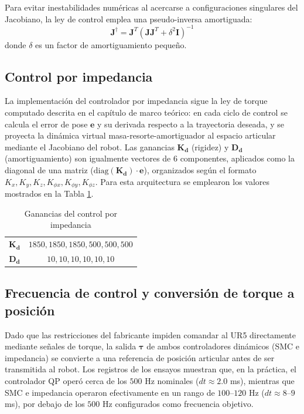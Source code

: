 Para evitar inestabilidades numéricas al acercarse a configuraciones
singulares del Jacobiano, la ley de control emplea una pseudo-inversa
amortiguada:
\begin{equation}
	\boldsymbol{J}^{\dagger} = \boldsymbol{J}^T \left(
	\boldsymbol{J}\boldsymbol{J}^T + \delta^2 \boldsymbol{I} \right)^{-1}
\end{equation}
donde \(\delta\) es un factor de amortiguamiento pequeño.

\subsection{Control por impedancia}

La implementación del controlador por impedancia sigue la ley de torque
computado descrita en el capítulo de marco teórico: en cada ciclo de control
se calcula el error de pose \(\boldsymbol{e}\) y su derivada respecto a la
trayectoria deseada, y se proyecta la dinámica virtual
masa-resorte-amortiguador
al espacio articular mediante el Jacobiano del robot. Las ganancias
\(\boldsymbol{K_d}\)
(rigidez) y \(\boldsymbol{D_d}\) (amortiguamiento) son igualmente vectores de 6
componentes, aplicados como la diagonal de una matriz
(\(\text{diag}(\boldsymbol{K_d})\cdot\boldsymbol{e}\)), organizados según el
formato \(K_x, K_y, K_z, K_{\phi x}, K_{\phi y}, K_{\phi z}\). Para esta
arquitectura se emplearon los valores mostrados en la Tabla
\ref{tab:ganancias_impedancia}.

\begin{table}[H]
	\centering
	\begin{tabular}{c|c}
		\(\boldsymbol{K_d}\) & \(1850,1850,1850,500,500,500\) \\
		\(\boldsymbol{D_d}\) & \(10,10,10,10,10,10\)
	\end{tabular}
	\caption{Ganancias del control por impedancia}
	\label{tab:ganancias_impedancia}
\end{table}

\subsection{Frecuencia de control y conversión de torque a posición}

Dado que las restricciones del fabricante impiden comandar al UR5 directamente
mediante señales de torque, la salida \(\boldsymbol{\tau}\) de ambos
controladores dinámicos (SMC e impedancia) se convierte a una referencia de
posición articular antes de ser transmitida al robot. Los registros de los
ensayos muestran que, en la práctica, el controlador QP operó cerca de los
\(500\) Hz nominales (\(dt\approx2.0\) ms), mientras que SMC e impedancia
operaron efectivamente en un rango de \(100\)--\(120\) Hz
(\(dt\approx8\)--\(9\) ms),
por debajo de los \(500\) Hz configurados como frecuencia objetivo.

